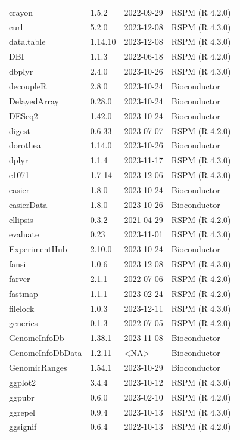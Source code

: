 \documentclass[]{article}
\begin{document}
\begin{longtable}[t]{llll}
crayon & 1.5.2 & 2022-09-29 & RSPM (R 4.2.0)\\
curl & 5.2.0 & 2023-12-08 & RSPM (R 4.3.0)\\
data.table & 1.14.10 & 2023-12-08 & RSPM (R 4.3.0)\\
\addlinespace
DBI & 1.1.3 & 2022-06-18 & RSPM (R 4.2.0)\\
dbplyr & 2.4.0 & 2023-10-26 & RSPM (R 4.3.0)\\
decoupleR & 2.8.0 & 2023-10-24 & Bioconductor\\
DelayedArray & 0.28.0 & 2023-10-24 & Bioconductor\\
DESeq2 & 1.42.0 & 2023-10-24 & Bioconductor\\
\addlinespace
digest & 0.6.33 & 2023-07-07 & RSPM (R 4.2.0)\\
dorothea & 1.14.0 & 2023-10-26 & Bioconductor\\
dplyr & 1.1.4 & 2023-11-17 & RSPM (R 4.3.0)\\
e1071 & 1.7-14 & 2023-12-06 & RSPM (R 4.3.0)\\
easier & 1.8.0 & 2023-10-24 & Bioconductor\\
\addlinespace
easierData & 1.8.0 & 2023-10-26 & Bioconductor\\
ellipsis & 0.3.2 & 2021-04-29 & RSPM (R 4.2.0)\\
evaluate & 0.23 & 2023-11-01 & RSPM (R 4.3.0)\\
ExperimentHub & 2.10.0 & 2023-10-24 & Bioconductor\\
fansi & 1.0.6 & 2023-12-08 & RSPM (R 4.3.0)\\
\addlinespace
farver & 2.1.1 & 2022-07-06 & RSPM (R 4.2.0)\\
fastmap & 1.1.1 & 2023-02-24 & RSPM (R 4.2.0)\\
filelock & 1.0.3 & 2023-12-11 & RSPM (R 4.3.0)\\
generics & 0.1.3 & 2022-07-05 & RSPM (R 4.2.0)\\
GenomeInfoDb & 1.38.1 & 2023-11-08 & Bioconductor\\
\addlinespace
GenomeInfoDbData & 1.2.11 & <NA> & Bioconductor\\
GenomicRanges & 1.54.1 & 2023-10-29 & Bioconductor\\
ggplot2 & 3.4.4 & 2023-10-12 & RSPM (R 4.3.0)\\
ggpubr & 0.6.0 & 2023-02-10 & RSPM (R 4.2.0)\\
ggrepel & 0.9.4 & 2023-10-13 & RSPM (R 4.3.0)\\
\addlinespace
ggsignif & 0.6.4 & 2022-10-13 & RSPM (R 4.2.0)\\

\end{longtable}
\end{document}
